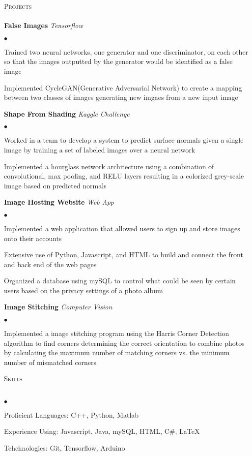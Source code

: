 \documentclass[letterpaper, 11pt]{article}
\newcommand{\lineunder}{\vspace*{-8pt} \\ \hspace*{-18pt} \hrulefill \\}
\newcommand{\header}[1]{{\hspace*{-15pt}\vspace*{6pt} \textsc{#1}}\vspace*{-6pt} \lineunder}
\newenvironment{achievements}{\begin{list}{$\bullet$}{\topsep 0pt \itemsep -2pt}}{\vspace*{4pt}\end{list}}
\begin{document}

\header{Projects}

\textbf{False Images} \textit{Tensorflow}
\begin{achievements}
	\item Trained two neural networks, one generator and one discriminator, on each other so that the images outputted by the generator would be identified as a false image
	\item Implemented CycleGAN(Generative Adversarial Network) to create a mapping between two classes of images generating new imgaes from a new input image
\end{achievements}

\textbf{Shape From Shading} \textit{Kaggle Challenge}
\begin{achievements}
	\item Worked in a team to develop a system to predict surface normals given a single image by training a set of labeled images over a neural network
	\item Implemented a hourglass network architecture using a combination of convolutional, max pooling, and RELU layers resulting in a colorized grey-scale image based on predicted normals
\end{achievements}

\textbf{Image Hosting Website} \textit{Web App}
\begin{achievements}
	\item Implemented a web application that allowed users to sign up and store images onto their accounts
	\item Extensive use of Python, Javascript, and HTML to build and connect the front and back end of the web pages
	\item Organized a database using mySQL to control what could be seen by certain users based on the privacy settings of a photo album
\end{achievements}

\textbf{Image Stitching} \textit{Computer Vision}
\begin{achievements}
	\item Implemented a image stitching program using the Harris Corner Detection algorithm to find corners determining the correct orientation to combine photos by calculating the maximum number of matching corners vs. the minimum number of mismatched corners
\end{achievements}


\header{Skills}
	\begin{achievements}
		\item Proficient Languages: C++, Python,  Matlab
		\item Experience Using: Javascript, Java, mySQL, HTML, C\#, \LaTeX
		\item Tehchnologies: Git, Tensorflow, Arduino
	\end{achievements}
\end{document}
